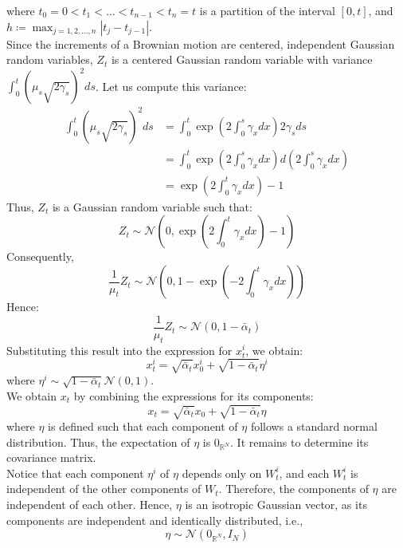 \documentclass[a4paper,10pt]{article}
\theoremstyle{definition} %
\theoremstyle{definition} %
\theoremstyle{definition} %
\theoremstyle{definition} %
\newcommand{\0}{\boldsymbol{0}}
\begin{document}
where $t_0 = 0 < t_1 < \dots < t_{n-1} < t_n = t$ is a partition of the interval $[0, t]$, and $h \coloneqq \max_{j=1,2,\dots,n} |t_j - t_{j-1}|$.
\\Since the increments of a Brownian motion are centered, independent Gaussian random variables, $Z_t$ is a centered Gaussian random variable with variance $\int_0^t (\mu_s \sqrt{2\gamma_s})^2 ds$. Let us compute this variance:
\begin{align*}
\int_0^t (\mu_s \sqrt{2\gamma_s})^2 ds &= \int_0^t \exp\left(2 \int_0^s \gamma_x dx\right) 2 \gamma_s ds \\
&= \int_0^t \exp\left(2 \int_0^s \gamma_x dx\right) d\left(2 \int_0^s \gamma_x dx\right) \\
&= \exp\left(2 \int_0^t \gamma_x dx\right) - 1
\end{align*}
Thus, $Z_t$ is a Gaussian random variable such that:
\begin{equation*}
Z_t \sim \mathcal{N}\left(0, \exp\left(2 \int_0^t \gamma_x dx\right) - 1\right)
\end{equation*}
Consequently,
\begin{equation*}
\frac{1}{\mu_t} Z_t \sim \mathcal{N}\left(0, 1 - \exp\left(-2 \int_0^t \gamma_x dx\right)\right)
\end{equation*}
Hence:
\begin{equation*}
\frac{1}{\mu_t} Z_t \sim \mathcal{N}\left(0, 1 - \bar{\alpha}_t\right)
\end{equation*}
Substituting this result into the expression for $x_t^i$, we obtain:
\begin{equation*}
x_t^i = \sqrt{\bar{\alpha}_t} x_0^i + \sqrt{1 - \bar{\alpha}_t} \eta^i
\end{equation*}
where $\eta^i \sim \sqrt{1 - \bar{\alpha}_t} \mathcal{N}(0, 1)$.
\\We obtain $x_t$ by combining the expressions for its components:
\begin{equation*}
x_t = \sqrt{\bar{\alpha}_t} x_0 + \sqrt{1 - \bar{\alpha}_t} \eta
\end{equation*}
where $\eta$ is defined such that each component of $\eta$ follows a standard normal distribution. Thus, the expectation of $\eta$ is $0_{\mathbb{R}^N}$. It remains to determine its covariance matrix.
\\Notice that each component $\eta^i$ of $\eta$ depends only on $W_t^i$, and each $W_t^i$ is independent of the other components of $W_t$. Therefore, the components of $\eta$ are independent of each other. Hence, $\eta$ is an isotropic Gaussian vector, as its components are independent and identically distributed, i.e.,
\begin{equation*}
\eta \sim \mathcal{N}(0_{\mathbb{R}^N}, I_N)
\end{equation*}
\end{document}
